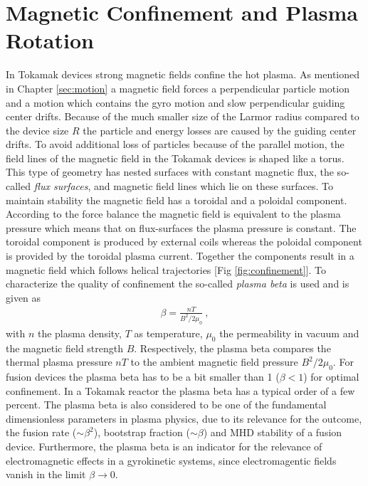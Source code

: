 \newpage
\section{Magnetic Confinement and Plasma Rotation}
\label{sec:confinement}

In Tokamak devices strong magnetic fields confine the hot plasma. As mentioned in Chapter \ref{sec:motion} a magnetic field forces a perpendicular particle motion and a motion which contains the gyro motion and slow perpendicular guiding center drifts. Because of the much smaller size of the Larmor radius compared to the device size $R$ the particle and energy losses are caused by the guiding center drifts. To avoid additional loss of particles because of the parallel motion, the field lines of the magnetic field in the Tokamak devices is shaped like a torus. This type of geometry has nested surfaces with constant magnetic flux, the so-called \textit{flux surfaces}, and magnetic field lines which lie on these surfaces. To maintain stability the magnetic field has a toroidal and a poloidal component. According to the force balance the magnetic field is equivalent to the plasma pressure which means that on flux-surfaces the plasma pressure is constant. \cite{Stroth2018, Wesson2004} The toroidal component is produced by external coils whereas the poloidal component is provided by the toroidal plasma current. Together the components result in a magnetic field which follows helical trajectories [Fig \ref{fig:confinement}]. To characterize the quality of confinement the so-called \textit{plasma beta} is used and is given as
\begin{gather}
    \beta = \frac{nT}{B^2/2\mu_0}~,
\end{gather} 
with $n$ the plasma density, $T$ as temperature, $\mu_0$ the permeability in vacuum and the magnetic field strength $B$. Respectively, the plasma beta compares the thermal plasma pressure $nT$ to the ambient magnetic field pressure $B^2/2\mu_0 $. For fusion devices the plasma beta has to be a bit smaller than 1 ($\beta < 1$) for optimal confinement. In a Tokamak reactor the plasma beta has a typical order of a few percent. 
The plasma beta is also considered to be one of the fundamental dimensionless parameters in plasma physics, due to its relevance for the outcome, the fusion rate ($\sim \beta^2$), bootstrap fraction ($\sim \beta$) and MHD stability of a fusion device. Furthermore, the plasma beta is an indicator for the relevance of electromagnetic effects in a gyrokinetic systems, since electromagentic fields vanish in the limit $\beta \rightarrow 0$.  \cite{Crandall_PHD}
\bigskip

